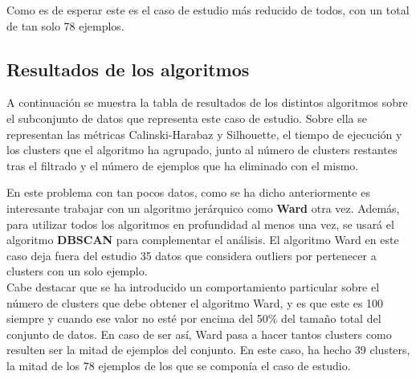 	Como es de esperar este es el caso de estudio más reducido de todos, con un total de tan solo 78 ejemplos.
	
	\subsection{Resultados de los algoritmos}
	
	A continuación se muestra la tabla de resultados de los distintos algoritmos sobre el subconjunto de datos que representa este caso de estudio. Sobre ella se representan las métricas Calinski-Harabaz y Silhouette, el tiempo de ejecución y los clusters que el algoritmo ha agrupado, junto al número de clusters restantes tras el filtrado y el número de ejemplos que ha eliminado con el mismo.
	
	\begin{table}[H]
		\centering
		\caption{Resultados de los algoritmos de clustering para el tercer caso de estudio.}
	\end{table}

	En este problema con tan pocos datos, como se ha dicho anteriormente es interesante trabajar con un algoritmo jerárquico como \textbf{Ward} otra vez. Además, para utilizar todos los algoritmos en profundidad al menos una vez, se usará el algoritmo \textbf{DBSCAN} para complementar el análisis. El algoritmo Ward en este caso deja fuera del estudio 35 datos que considera outliers por pertenecer a clusters con un solo ejemplo.\\
	
	Cabe destacar que se ha introducido un comportamiento particular sobre el número de clusters que debe obtener el algoritmo Ward, y es que este es 100 siempre y cuando ese valor no esté por encima del 50\% del tamaño total del conjunto de datos. En caso de ser así, Ward pasa a hacer tantos clusters como resulten ser la mitad de ejemplos del conjunto. En este caso, ha hecho 39 clusters, la mitad de los 78 ejemplos de los que se componía el caso de estudio.
	
